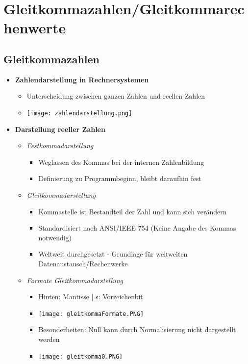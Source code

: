 \pagebreak

\section{Gleitkommazahlen/Gleitkommarechenwerte}

\subsection{Gleitkommazahlen}
    \begin{itemize}
        \item \textbf{Zahlendarstellung in Rechnersystemen}
            \begin{itemize}
                \item Unterscheidung zwischen ganzen Zahlen und reellen Zahlen
                \item[] \texttt{[image: zahlendarstellung.png]}
            \end{itemize}

        \item \textbf{Darstellung reeller Zahlen}
            \begin{itemize}
                \item \textit{Festkommadarstellung}
                    \begin{itemize}
                        \item Weglassen des Kommas bei der internen Zahlenbildung
                        \item Definierung zu Programmbeginn, bleibt daraufhin fest
                    \end{itemize}
                \item \textit{Gleitkommadarstellung}
                    \begin{itemize}
                        \item Kommastelle ist Bestandteil der Zahl und kann sich verändern
                        \item Standardisiert nach ANSI/IEEE 754 (Keine Angabe des Kommas notwendig)
                        \item Weltweit durchgesetzt - Grundlage für weltweiten Datenaustausch/Rechenwerke
                    \end{itemize}
                \item \textit{Formate Gleitkommadarstellung}
                    \begin{itemize}
                        \item Hinten: Mantisse | s: Vorzeichenbit
                        \item[] \texttt{[image: gleitkommaFormate.PNG]}
                        \item Besonderheiten: Null kann durch Normalisierung nicht dargestellt werden
                        \item[] \texttt{[image: gleitkomma0.PNG]} 
                    \end{itemize}
            \end{itemize}
    \end{itemize}

